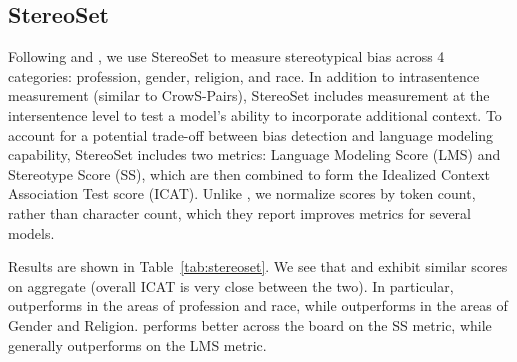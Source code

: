 \subsection{StereoSet}

Following \citet{J1WhitePaper} and \citet{1TMoE2021}, we use StereoSet \cite{nadeem2020stereoset} to measure stereotypical bias across 4 categories: profession, gender, religion, and race.  In addition to intrasentence measurement (similar to CrowS-Pairs), StereoSet includes  measurement at the intersentence level to test a model's ability to incorporate additional context.  To account for a potential trade-off between bias detection and language modeling capability, StereoSet includes two metrics: Language Modeling Score (LMS) and Stereotype Score (SS), which are then combined to form the Idealized Context Association Test score (ICAT). Unlike \citet{J1WhitePaper}, we normalize scores by token count, rather than character count, which they report improves metrics for several models.

Results are shown in Table~\ref{tab:stereoset}. We see that \davinci{} and \OPT{} exhibit similar scores on aggregate (overall ICAT is very close between the two). In particular, \davinci{} outperforms in the areas of profession and race, while \OPT{} outperforms in the areas of Gender and Religion. \OPT{} performs better across the board on the SS metric, while \davinci{} generally outperforms on the LMS metric.


